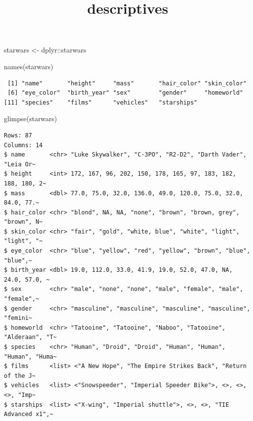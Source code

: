 \documentclass[
  letterpaper,
  DIV=11,
  numbers=noendperiod]{scrartcl}
\title{descriptives}
\author{}
\date{}
\newenvironment{Shaded}{\begin{snugshade}}{\end{snugshade}}
\newcommand{\FunctionTok}[1]{\textcolor[rgb]{0.28,0.35,0.67}{#1}}
\newcommand{\NormalTok}[1]{\textcolor[rgb]{0.00,0.23,0.31}{#1}}
\newcommand{\OtherTok}[1]{\textcolor[rgb]{0.00,0.23,0.31}{#1}}
\newcommand{\SpecialCharTok}[1]{\textcolor[rgb]{0.37,0.37,0.37}{#1}}
\renewcommand*\contentsname{Table of contents}
\newcommand\contentsname{Table of contents}
\begin{document}
\maketitle

\renewcommand*\contentsname{Table of contents}
{
\hypersetup{linkcolor=}
\setcounter{tocdepth}{3}
\tableofcontents
}

\begin{Shaded}
\begin{Highlighting}[]
\NormalTok{starwars }\OtherTok{\textless{}{-}}\NormalTok{ dplyr}\SpecialCharTok{::}\NormalTok{starwars}
\end{Highlighting}
\end{Shaded}

\begin{Shaded}
\begin{Highlighting}[]
\FunctionTok{names}\NormalTok{(starwars)}
\end{Highlighting}
\end{Shaded}

\begin{verbatim}
 [1] "name"       "height"     "mass"       "hair_color" "skin_color"
 [6] "eye_color"  "birth_year" "sex"        "gender"     "homeworld" 
[11] "species"    "films"      "vehicles"   "starships" 
\end{verbatim}

\begin{Shaded}
\begin{Highlighting}[]
\FunctionTok{glimpse}\NormalTok{(starwars)}
\end{Highlighting}
\end{Shaded}

\begin{verbatim}
Rows: 87
Columns: 14
$ name       <chr> "Luke Skywalker", "C-3PO", "R2-D2", "Darth Vader", "Leia Or~
$ height     <int> 172, 167, 96, 202, 150, 178, 165, 97, 183, 182, 188, 180, 2~
$ mass       <dbl> 77.0, 75.0, 32.0, 136.0, 49.0, 120.0, 75.0, 32.0, 84.0, 77.~
$ hair_color <chr> "blond", NA, NA, "none", "brown", "brown, grey", "brown", N~
$ skin_color <chr> "fair", "gold", "white, blue", "white", "light", "light", "~
$ eye_color  <chr> "blue", "yellow", "red", "yellow", "brown", "blue", "blue",~
$ birth_year <dbl> 19.0, 112.0, 33.0, 41.9, 19.0, 52.0, 47.0, NA, 24.0, 57.0, ~
$ sex        <chr> "male", "none", "none", "male", "female", "male", "female",~
$ gender     <chr> "masculine", "masculine", "masculine", "masculine", "femini~
$ homeworld  <chr> "Tatooine", "Tatooine", "Naboo", "Tatooine", "Alderaan", "T~
$ species    <chr> "Human", "Droid", "Droid", "Human", "Human", "Human", "Huma~
$ films      <list> <"A New Hope", "The Empire Strikes Back", "Return of the J~
$ vehicles   <list> <"Snowspeeder", "Imperial Speeder Bike">, <>, <>, <>, "Imp~
$ starships  <list> <"X-wing", "Imperial shuttle">, <>, <>, "TIE Advanced x1",~
\end{verbatim}
\end{document}
